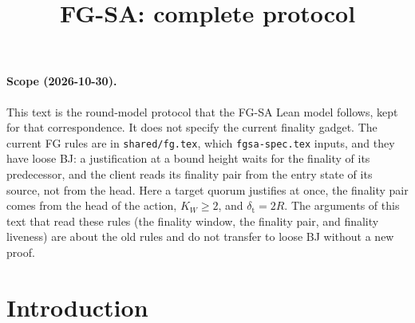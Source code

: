 \documentclass{article}
\title{FG-SA: complete protocol}
\author{}
\date{}
\theoremstyle{plain}
\theoremstyle{definition}
\theoremstyle{remark}
\begin{document}
\maketitle

\paragraph{Scope (2026-10-30).}  This text is the round-model protocol
that the FG-SA Lean model follows, kept for that correspondence.  It does
not specify the current finality gadget.  The current FG rules are in
\texttt{shared/fg.tex}, which \texttt{fgsa-spec.tex} inputs, and they
have loose BJ: a justification at
a bound height waits for the finality of its predecessor, and the client
reads its finality pair from the entry state of its source, not from the
head.  Here a target quorum justifies at once, the finality pair comes
from the head of the action, $K_W\geq2$, and $\delta_{\mathrm t}=2R$.  The
arguments of this text that read these rules (the finality window, the
finality pair, and finality liveness) are about the old rules and do not
transfer to loose BJ without a new proof.

\section{Introduction}\label{sec:intro}
\end{document}

